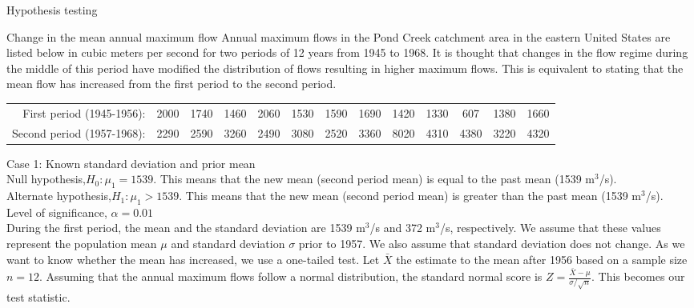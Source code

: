 \documentclass[8pt]{beamer}
\renewcommand{\emph}[1]{\textcolor{myorange}{#1}}
\begin{document}
\begin{frame}{Hypothesis testing}

    \begin{exampleblock}{Change in  the mean annual maximum flow}
Annual maximum flows in the Pond Creek catchment area in the eastern United States are listed below in cubic meters per second for two periods of 12 years from 1945 to 1968. It is thought that changes in the flow regime during the middle of this period have modified the distribution of flows resulting in higher maximum flows. This is equivalent to stating that the mean flow has increased from the first period to the second period.
\setlength{\tabcolsep}{1pt} %
  \begin{tabular}{rcccccccccccc}
      First period (1945-1956): & 2000 & 1740 & 1460 & 2060 & 1530 & 1590 & 1690 & 1420 & 1330 & 607 & 1380 & 1660 \\
Second period (1957-1968): & 2290 & 2590 & 3260 & 2490 & 3080 & 2520 & 3360 & 8020 & 4310 & 4380 & 3220 & 4320
  \end{tabular}
    \alert{Case 1: Known standard deviation and prior mean}\\
    \emph{Null hypothesis},$H_0 : \mu_1 = 1539$. This means that the new mean (second period mean) is equal to the past mean (1539 m$^3$/s).\\
    \emph{Alternate hypothesis},$H_1 : \mu_1 > 1539$. This means that the new mean (second period mean) is greater than the past mean (1539 m$^3$/s).\\
    \emph{Level of significance}, $\alpha = 0.01$ \\
    During the first period, the mean and the standard deviation are 1539 m$^3$/s and 372 m$^3$/s, respectively. We assume that these values  represent the population mean $\mu$ and standard deviation $\sigma$ prior to 1957. We also assume that standard deviation does not change. As we want to know whether the mean has increased, we use a \emph{one-tailed test}. 
    Let $\bar{X}$ the estimate to the mean after 1956 based on a sample size $n=12$. Assuming that the annual maximum flows follow a \emph{normal distribution}, the \emph{standard normal score} is $Z = \frac{\bar{X} - \mu}{\sigma/\sqrt{n}}$. This becomes our \emph{test statistic}. \\
    
    \end{exampleblock}

\end{frame}
\end{document}
